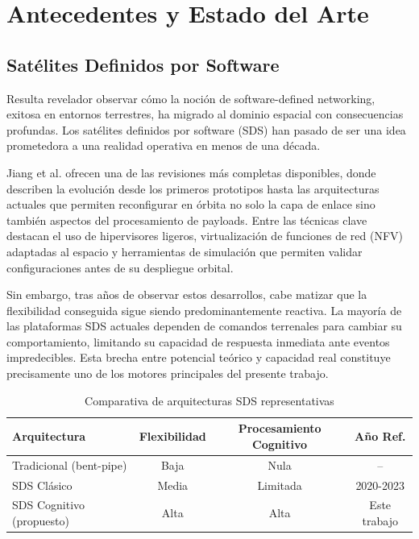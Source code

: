 \section{Antecedentes y Estado del Arte}

\subsection{Satélites Definidos por Software}

Resulta revelador observar cómo la noción de software-defined networking, exitosa en entornos terrestres, ha migrado al dominio espacial con consecuencias profundas. Los satélites definidos por software (SDS) han pasado de ser una idea prometedora a una realidad operativa en menos de una década. 

Jiang et al. \cite{Jiang2023} ofrecen una de las revisiones más completas disponibles, donde describen la evolución desde los primeros prototipos hasta las arquitecturas actuales que permiten reconfigurar en órbita no solo la capa de enlace sino también aspectos del procesamiento de payloads. Entre las técnicas clave destacan el uso de hipervisores ligeros, virtualización de funciones de red (NFV) adaptadas al espacio y herramientas de simulación que permiten validar configuraciones antes de su despliegue orbital. 

Sin embargo, tras años de observar estos desarrollos, cabe matizar que la flexibilidad conseguida sigue siendo predominantemente reactiva. La mayoría de las plataformas SDS actuales dependen de comandos terrenales para cambiar su comportamiento, limitando su capacidad de respuesta inmediata ante eventos impredecibles. Esta brecha entre potencial teórico y capacidad real constituye precisamente uno de los motores principales del presente trabajo.

\begin{table}[h]
\centering
\caption{Comparativa de arquitecturas SDS representativas}
\label{tab:arquitecturas_sds}
\begin{tabular}{lccc}
\hline
\textbf{Arquitectura} & \textbf{Flexibilidad} & \textbf{Procesamiento Cognitivo} & \textbf{Año Ref.} \\
\hline
Tradicional (bent-pipe) & Baja & Nula & -- \\
SDS Clásico & Media & Limitada & 2020-2023 \\
SDS Cognitivo (propuesto) & Alta & Alta & Este trabajo \\
\hline
\end{tabular}
\end{table}

